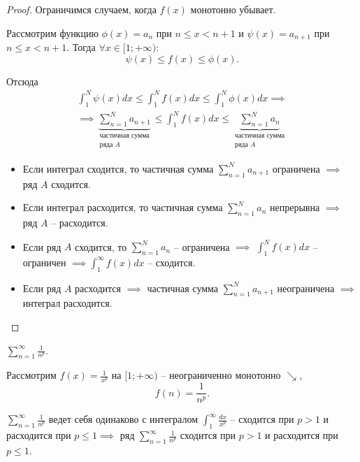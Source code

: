 \begin{proof}
    Ограничимся случаем, когда $f(x)$ монотонно убывает.

    Рассмотрим функцию $\phi(x) = a_n$ при $n \leqslant x < n+1$ и $\psi(x) = a_{n+1}$ при $n\leqslant x <n + 1$. Тогда $\forall x \in [1;+\infty)$:
    \[
        \psi(x) \leqslant f(x) \leqslant\phi(x).
    \]

    Отсюда
    \begin{multline*}
        \int_{1}^{N}\psi(x)dx \leqslant \int_{1}^{N}f(x)dx \leqslant\int_{1}^{N}\phi(x)dx \implies \\
        \implies \underbrace{\sum_{n=1}^{N}a_{n+1}}_{\begin{array}{c}
            \text{частичная сумма} \\
            \text{ряда }A
        \end{array}} \leqslant \int_{1}^{N}f(x)dx \leqslant \underbrace{\sum_{n=1}^{N}a_n}_{\begin{array}{c}
                \text{частичная сумма} \\
                \text{ряда }A
            \end{array}}
    \end{multline*}
    \begin{itemize}
        \item Если интеграл сходится, то частичная сумма $\sum_{n=1}^{N}a_{n+1}$ ограничена $\implies$ ряд $A$ сходится.

        \item Если интеграл расходится, то частичная сумма $\sum_{n=1}^{N}a_n$ непрерывна $\implies$ ряд $A$ -- расходится.

        \item Если ряд $A$ сходится, то $\sum_{n=1}^{N}a_n$ -- ограничена $\implies$ $\int_{1}^{N}f(x)dx$ -- ограничен $\implies \int_{1}^{\infty}f(x)dx$ -- сходится.

        \item Если ряд $A$ расходится $\implies$ частичная сумма $\sum_{n=1}^{N}a_{n+1}$ неограничена $\implies$ интеграл расходится.
    \end{itemize}
\end{proof}

\begin{example}
    $\sum_{n=1}^{\infty}\frac{1}{n^p}$.

    Рассмотрим $f(x) = \frac{1}{x^p}$ на $[1;+\infty)$ -- неограниченно монотонно $\searrow$,
    \[
        f(n) = \frac{1}{n^p}.
    \]

    $\sum_{n=1}^{\infty}\frac{1}{n^p}$ ведет себя одинаково с интегралом $\int_{1}^{\infty}\frac{dx}{x^p}$ -- сходится при $p>1$ и расходится при $p\leqslant1 \implies$ ряд $\sum_{n=1}^{\infty}\frac{1}{n^p}$ сходится при $p>1$ и расходится при $p\leqslant1$.
\end{example}

